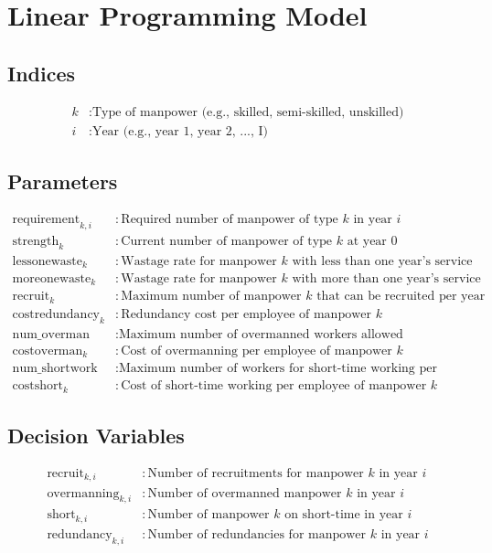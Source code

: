\documentclass{article}
\begin{document}
\section*{Linear Programming Model}

\subsection*{Indices}
\begin{align*}
k & : \text{Type of manpower (e.g., skilled, semi-skilled, unskilled)} \\
i & : \text{Year (e.g., year 1, year 2, ..., I)}
\end{align*}

\subsection*{Parameters}
\begin{align*}
\text{requirement}_{k,i} & : \text{Required number of manpower of type } k \text{ in year } i \\
\text{strength}_{k} & : \text{Current number of manpower of type } k \text{ at year 0} \\
\text{lessonewaste}_{k} & : \text{Wastage rate for manpower } k \text{ with less than one year's service} \\
\text{moreonewaste}_{k} & : \text{Wastage rate for manpower } k \text{ with more than one year's service} \\
\text{recruit}_{k} & : \text{Maximum number of manpower } k \text{ that can be recruited per year} \\
\text{costredundancy}_{k} & : \text{Redundancy cost per employee of manpower } k \\
\text{num\_overman} & : \text{Maximum number of overmanned workers allowed} \\
\text{costoverman}_{k} & : \text{Cost of overmanning per employee of manpower } k \\
\text{num\_shortwork} & : \text{Maximum number of workers for short-time working per manpower type} \\
\text{costshort}_{k} & : \text{Cost of short-time working per employee of manpower } k
\end{align*}

\subsection*{Decision Variables}
\begin{align*}
\text{recruit}_{k,i} & : \text{Number of recruitments for manpower } k \text{ in year } i \\
\text{overmanning}_{k,i} & : \text{Number of overmanned manpower } k \text{ in year } i \\
\text{short}_{k,i} & : \text{Number of manpower } k \text{ on short-time in year } i \\
\text{redundancy}_{k,i} & : \text{Number of redundancies for manpower } k \text{ in year } i
\end{align*}
\end{document}
